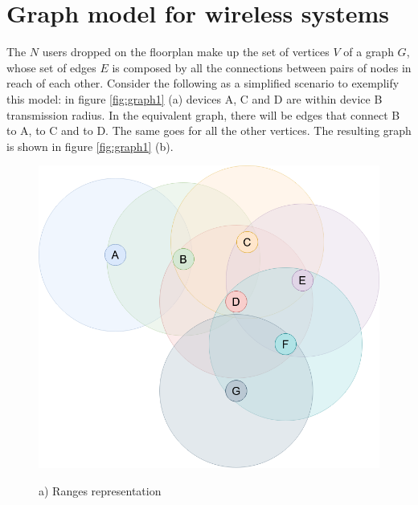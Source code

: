 \section{Graph model for wireless systems}
The $N$ users dropped on the floorplan make up the set of vertices $V$ of a
graph $G$, whose set of edges $E$ is composed by all the connections between
pairs of nodes in reach of each other. Consider the following as a simplified
scenario to exemplify this model: in figure \ref{fig:graph1} (a) devices A, C
and D are within device B transmission radius. In the equivalent graph, there
will be edges that connect B to A, to C and to D. The same goes for all the
other vertices. The resulting graph is shown in figure \ref{fig:graph1} (b).
\begin{figure}[H]
	\begin{minipage}{.5\textwidth}
        \includegraphics[scale=.23]{img/wireless_graph_1.png}
        \begin{center}
            a) Ranges representation
        \end{center}
	\end{minipage}
	\begin{minipage}{.5\textwidth} 

\end{minipage}
\end{figure}
